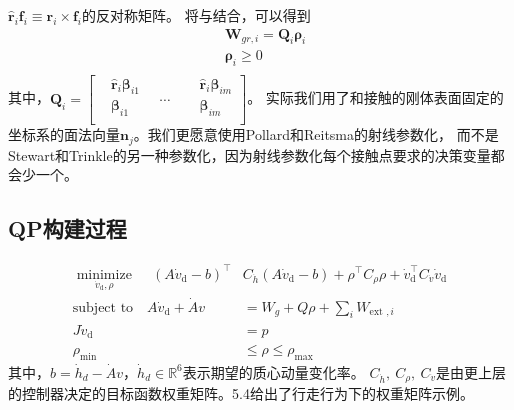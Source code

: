 ${{\hat{\boldsymbol{r}}}_{i}}{\boldsymbol{f}_{i}}\equiv {\boldsymbol{r}_{i}}\times {\boldsymbol{f}_{i}}$的反对称矩阵。
将与结合，可以得到
\begin{equation}
    \label{equ:wrench_matrix}
    \begin{aligned}
        & {{\boldsymbol{W}}_{gr,i}}={{\boldsymbol{Q}}_{i}}{{\boldsymbol{\rho}}_{i}} \\ 
       & {{\boldsymbol{\rho}}_{i}}\ge 0 \\ 
      \end{aligned}        
\end{equation}
其中，${{\boldsymbol{Q}}_{i}}=\left[ \begin{aligned}
    & {{{\hat{\boldsymbol{r}}}}_{i}}{{\boldsymbol{\beta}}_{i1}} \\ 
   & {{\boldsymbol{\beta}}_{i1}}\ \ \ \  \\ 
  \end{aligned} \right.\ \ \ \ \cdots \ \ \ \ \left. \begin{aligned}
    & {{{\hat{\boldsymbol{r}}}}_{i}}{{\boldsymbol{\beta}}_{im}} \\ 
   & {{\boldsymbol{\beta}}_{im}} \\ 
  \end{aligned} \right]
  $。
  实际我们用了和接触的刚体表面固定的坐标系的面法向量${{\boldsymbol{n}}_{j}}$。我们更愿意使用Pollard和Reitsma的射线参数化，
  而不是Stewart和Trinkle的另一种参数化，因为射线参数化每个接触点要求的决策变量都会少一个。
\subsection{QP构建过程}
\begin{equation}
    \label{equ:qp_control}
    \begin{aligned}
       \underset{{{{\dot{v}}}_{\text{d}}},\rho }{\mathop{\operatorname{minimize}}}\,\quad {{\left( A{{{\dot{v}}}_{\text{d}}}-b \right)}^{\top }}&{{C}_{{\dot{h}}}}\left( A{{{\dot{v}}}_{\text{d}}}-b \right)+{{\rho }^{\top }}{{C}_{\rho }}\rho +\dot{v}_{\text{d}}^{\top }{{C}_{{\dot{v}}}}{{{\dot{v}}}_{\text{d}}} \\ 
        \text{subject to}\quad A{{{\dot{v}}}_{\text{d}}}+\dot{A}v&={{W}_{g}}+Q\rho +\sum\limits_{i}{{{W}_{\text{ext },i}}} \\ 
        J{{{\dot{v}}}_{\text{d}}}&=p \\ 
        {{\rho }_{\min }}&\le \rho \le {{\rho }_{\max }} 
      \end{aligned}
\end{equation}
其中，$b={{\dot{h}}_{d}}-\dot{A}v$，${{\dot{h}}_{d}}\in {{\mathbb{R}}^{6}}$表示期望的质心动量变化率。
${{C}_{{\dot{h}}}},\ {{C}_{\rho }},\ {{C}_{{\dot{v}}}}$是由更上层的控制器决定的目标函数权重矩阵。5.4给出了行走行为下的权重矩阵示例。
